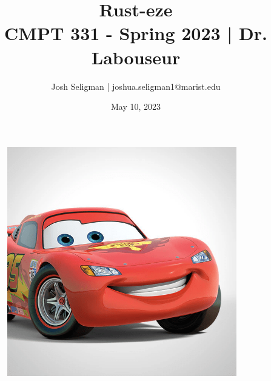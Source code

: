 \documentclass[letterpaper, 10pt, DIV=13]{scrartcl}
\title {
	\normalfont
	\huge{Rust-eze} \\
	\vspace{10pt}
	\large{CMPT 331 - Spring 2023 | Dr. Labouseur}
}
\author{\normalfont Josh Seligman | joshua.seligman1@marist.edu}
\date{\normalfont May 10, 2023}
\numberwithin{equation}{section}
\numberwithin{figure}{section}
\numberwithin{table}{section}
\begin{document}
\maketitle

\begin{figure}[ht]
  \centering
  \includegraphics[width = 10cm]{lightning_mcqueen.png}
\end{figure}

\newpage
\end{document}
